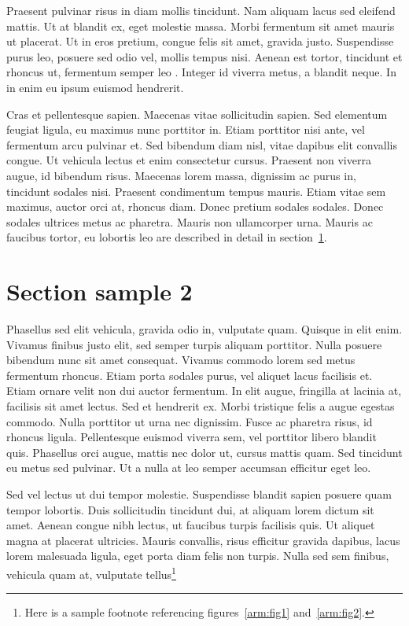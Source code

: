 Praesent pulvinar risus in diam mollis tincidunt. Nam aliquam lacus sed eleifend mattis. Ut at blandit ex, eget molestie massa. Morbi fermentum sit amet mauris ut placerat. Ut in eros pretium, congue felis sit amet, gravida justo. Suspendisse purus leo, posuere sed odio vel, mollis tempus nisi. Aenean est tortor, tincidunt et rhoncus ut, fermentum semper leo \cite{book-crossref}. Integer id viverra metus, a blandit neque. In in enim eu ipsum euismod hendrerit.

Cras et pellentesque sapien. Maecenas vitae sollicitudin sapien. Sed elementum feugiat ligula, eu maximus nunc porttitor in. Etiam porttitor nisi ante, vel fermentum arcu pulvinar et. Sed bibendum diam nisl, vitae dapibus elit convallis congue. Ut vehicula lectus et enim consectetur cursus. Praesent non viverra augue, id bibendum risus. Maecenas lorem massa, dignissim ac purus in, tincidunt sodales nisi. Praesent condimentum tempus mauris. Etiam vitae sem maximus, auctor orci at, rhoncus diam. Donec pretium sodales sodales. Donec sodales ultrices metus ac pharetra. Mauris non ullamcorper urna. Mauris ac faucibus tortor, eu lobortis leo are described in detail in section~\ref{ch1:sec}.

\section{Section sample 2}\label{ch1:sec}

Phasellus sed elit vehicula, gravida odio in, vulputate quam. Quisque in elit enim. Vivamus finibus justo elit, sed semper turpis aliquam porttitor. Nulla posuere bibendum nunc sit amet consequat. Vivamus commodo lorem sed metus fermentum rhoncus. Etiam porta sodales purus, vel aliquet lacus facilisis et. Etiam ornare velit non dui auctor fermentum. In elit augue, fringilla at lacinia at, facilisis sit amet lectus. Sed et hendrerit ex. Morbi tristique felis a augue egestas commodo. Nulla porttitor ut urna nec dignissim. Fusce ac pharetra risus, id rhoncus ligula. Pellentesque euismod viverra sem, vel porttitor libero blandit quis. Phasellus orci augue, mattis nec dolor ut, cursus mattis quam. Sed tincidunt eu metus sed pulvinar. Ut a nulla at leo semper accumsan efficitur eget leo.

Sed vel lectus ut dui tempor molestie. Suspendisse blandit sapien posuere quam tempor lobortis. Duis sollicitudin tincidunt dui, at aliquam lorem dictum sit amet. Aenean congue nibh lectus, ut faucibus turpis facilisis quis. Ut aliquet magna at placerat ultricies. Mauris convallis, risus efficitur gravida dapibus, lacus lorem malesuada ligula, eget porta diam felis non turpis. Nulla sed sem finibus, vehicula quam at, vulputate tellus\footnote{Here is a sample footnote referencing figures~\ref{arm:fig1}
and~\ref{arm:fig2}.}  

